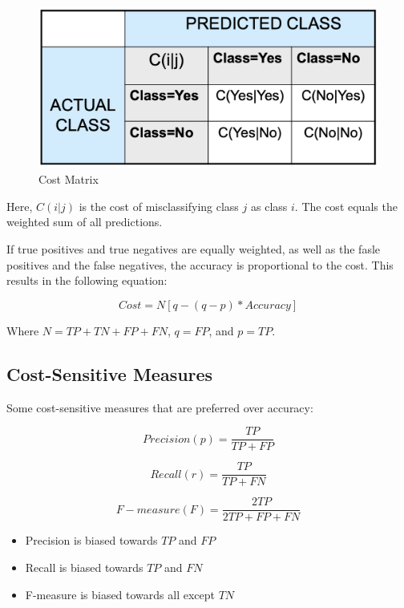 \bigskip
\begin{figure}[H]
    \centering
    \includegraphics[scale=0.5]{figures/costmatrix.png}
    \caption{Cost Matrix}
\end{figure}

Here, $C(i|j)$ is the cost of misclassifying class $j$ as class $i$. The cost equals the weighted sum of all predictions.

\bigskip

If true positives and true negatives are equally weighted, as well as the fasle positives and the false negatives, the accuracy is proportional to the cost.
This results in the following equation:

\begin{equation}
    Cost = N[q-(q-p)*Accuracy]
\end{equation}
\begin{center}
    Where $N = TP + TN + FP + FN$, $q = FP$, and $p = TP$.
\end{center}


\subsection{Cost-Sensitive Measures}
Some cost-sensitive measures that are preferred over accuracy:

\begin{equation}
    Precision(p) = \frac{TP}{TP+FP}
\end{equation}

\begin{equation}
    Recall(r) = \frac{TP}{TP+FN}
\end{equation}

\begin{equation}
    F-measure(F) = \frac{2TP}{2TP+FP+FN}
\end{equation}

\begin{itemize}
    \item Precision is biased towards $TP$ and $FP$
    \item Recall is biased towards $TP$ and $FN$
    \item F-measure is biased towards all except $TN$
\end{itemize}

